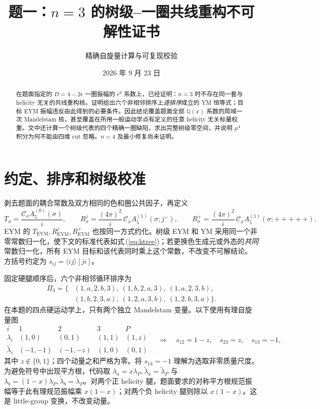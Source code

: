 \documentclass[UTF8,11pt,a4paper]{ctexart}
\title{题一：$n=3$ 的树级--一圈共线重构不可解性证书}
\author{精确自旋量计算与可复现校验}
\date{2026 年 9 月 23 日}
\newcommand{\EYM}{\mathrm{EYM}}
\newcommand{\cC}{\mathcal C_x}
\begin{document}
\maketitle

\begin{abstract}
在题面指定的 $D=4-2\epsilon$ 一圈振幅的 $\epsilon^0$ 系数上，已经证明：$n=3$ 时不存在同一套与 helicity 无关的共线重构核。证明给出六个非相邻排序上\emph{逐排序}成立的 YM 恒等式；目标 EYM 振幅违反由此得到的必要条件。因此结论覆盖题面全部 $\mathbb Q(x)$ 系数的局域一次 Mandelstam 核，甚至覆盖在所用一般运动学点有定义的任意 helicity 无关标量权重。文中还计算一个树级代表的四个精确一圈缺陷，求出完整树级零空间，并说明 $\mu^4$ 积分为何不能由四维 cut 忽略。$n=4$ 及最小修复尚未证明。
\end{abstract}

\section{约定、排序和树级校准}

剥去题面的耦合常数及双方相同的色和圈公共因子，再定义
\[
 T_\sigma=\frac{\cC A^{(0)}_5(\sigma)}{i},\qquad
 R^j_\sigma=\frac{(4\pi)^2}{i}\,\cC A^{(1)}_5(\sigma;j^-),\qquad
 R^+_\sigma=\frac{(4\pi)^2}{i}\,\cC A^{(1)}_5(\sigma;+++++).
\]
EYM 的 $T_{\EYM},R^j_{\EYM},R^+_{\EYM}$ 也按同一方式约化。树级 EYM 和 YM 采用同一个非零常数归一化，使下文的标准代表如式\,(\ref{eq:ktree})；若更换色生成元或外态的\emph{共同}常数归一化，所有 EYM 目标和该代表同时乘上这个常数，不改变不可解结论。方括号约定为 $s_{ij}=\langle ij\rangle[ji]$。

固定硬腿顺序后，六个非相邻循环排序为
\begin{equation}
\begin{aligned}
\Pi_3=\{&(1,a,2,b,3),\ (1,b,2,a,3),\ (1,a,2,3,b),\\
          &(1,b,2,3,a),\ (1,2,a,3,b),\ (1,2,b,3,a)\}.
\end{aligned}\label{eq:orders}
\end{equation}
在本题的四点硬运动学上，只有两个独立 Mandelstam 变量。以下使用有理自旋量图
\begin{equation}
\begin{array}{c|cccc}
 i&1&2&3&P\\\hline
 \lambda_i&(1,0)&(0,1)&(1,1)&(1,z)\\
 \widetilde\lambda_i&(-1,-1)&(-1,-z)&(1,0)&(0,1)
\end{array}
\quad\Longrightarrow\quad
 s_{12}=1-z,\quad s_{23}=z,\quad s_{13}=-1,
\label{eq:chart}
\end{equation}
其中 $z\notin\{0,1\}$；四个动量之和严格为零。将 $s_{13}=-1$ 理解为选取非零质量尺度。为避免符号中出现平方根，代码取 $\lambda_a=x\lambda_P,\widetilde\lambda_a=\widetilde\lambda_P$ 与 $\lambda_b=(1-x)\lambda_P,\widetilde\lambda_b=\widetilde\lambda_P$。对两个正 helicity 腿，题面要求的对称平方根规范振幅等于此有理规范振幅乘 $x(1-x)$；对两个负 helicity 腿则除以 $x(1-x)$。这是 little-group 变换，不改变动量。
\end{document}
